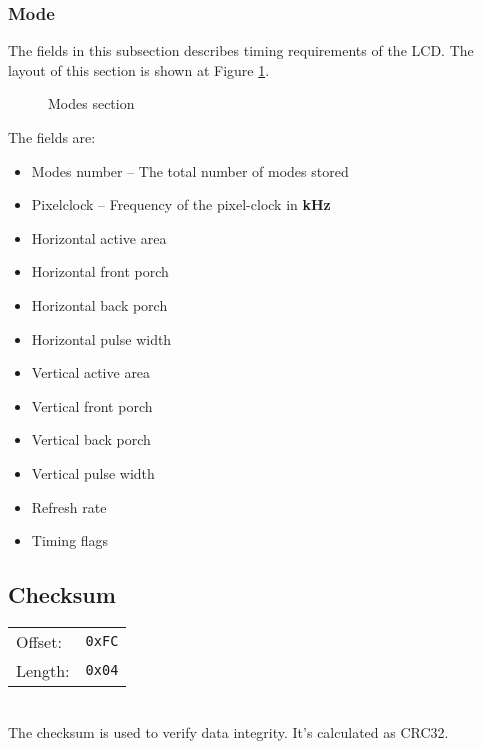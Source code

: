 \documentclass{article}
\newcommand{\regs}[2]{
	\begin{tabular}{l l}
		Offset: & \texttt{#1} \\
		Length: & \texttt{#2}
	\end{tabular} \\
	}
\begin{document}
			

		\subsubsection{Mode}
		The fields in this subsection describes timing requirements of the LCD. The layout of this section is shown at Figure \ref{fig:EEPROM_MODES}.
		\begin{figure}[H]
			\centering
			
			\caption{Modes section}
			\label{fig:EEPROM_MODES}
		\end{figure}
	
		The fields are:
		\begin{itemize}
			\item Modes number -- The total number of modes stored
			\item Pixelclock -- Frequency of the pixel-clock in \textbf{kHz}
			\item Horizontal active area
			\item Horizontal front porch
			\item Horizontal back porch
			\item Horizontal pulse width
			\item Vertical active area
			\item Vertical front porch
			\item Vertical back porch
			\item Vertical pulse width
			\item Refresh rate
			\item Timing flags
		\end{itemize}
		
		

		
	\subsection{Checksum}
	\regs{0xFC}{0x04}
	
	The checksum is used to verify data integrity. It's calculated as CRC32.
\end{document}
